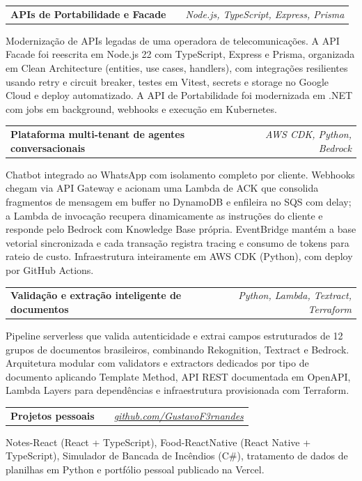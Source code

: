 \documentclass[a4paper,11pt]{article}
\makeatletter
\newenvironment{jobshort}[2]
    {
    \begin{tabularx}{\linewidth}{@{}l X r@{}}
    \textbf{#1} & \hfill &  #2 \\[3.75pt]
    \end{tabularx}
    }
    {
    }
\makeatother
\begin{document}
\begin{jobshort}{APIs de Portabilidade e Facade}{\textit{Node.js, TypeScript, Express, Prisma}}
Modernização de APIs legadas de uma operadora de telecomunicações. A API Facade foi reescrita em Node.js 22 com TypeScript, Express e Prisma, organizada em Clean Architecture (entities, use cases, handlers), com integrações resilientes usando retry e circuit breaker, testes em Vitest, secrets e storage no Google Cloud e deploy automatizado. A API de Portabilidade foi modernizada em .NET com jobs em background, webhooks e execução em Kubernetes.
\end{jobshort}

\begin{jobshort}{Plataforma multi-tenant de agentes conversacionais}{\textit{AWS CDK, Python, Bedrock}}
Chatbot integrado ao WhatsApp com isolamento completo por cliente. Webhooks chegam via API Gateway e acionam uma Lambda de ACK que consolida fragmentos de mensagem em buffer no DynamoDB e enfileira no SQS com delay; a Lambda de invocação recupera dinamicamente as instruções do cliente e responde pelo Bedrock com Knowledge Base própria. EventBridge mantém a base vetorial sincronizada e cada transação registra tracing e consumo de tokens para rateio de custo. Infraestrutura inteiramente em AWS CDK (Python), com deploy por GitHub Actions.
\end{jobshort}

\begin{jobshort}{Validação e extração inteligente de documentos}{\textit{Python, Lambda, Textract, Terraform}}
Pipeline serverless que valida autenticidade e extrai campos estruturados de 12 grupos de documentos brasileiros, combinando Rekognition, Textract e Bedrock. Arquitetura modular com validators e extractors dedicados por tipo de documento aplicando Template Method, API REST documentada em OpenAPI, Lambda Layers para dependências e infraestrutura provisionada com Terraform.
\end{jobshort}

\begin{jobshort}{Projetos pessoais}{\href{https://github.com/GustavoF3rnandes}{\textit{github.com/GustavoF3rnandes}}}
Notes-React (React + TypeScript), Food-ReactNative (React Native + TypeScript), Simulador de Bancada de Incêndios (C\#), tratamento de dados de planilhas em Python e portfólio pessoal publicado na Vercel.
\end{jobshort}

\end{document}
